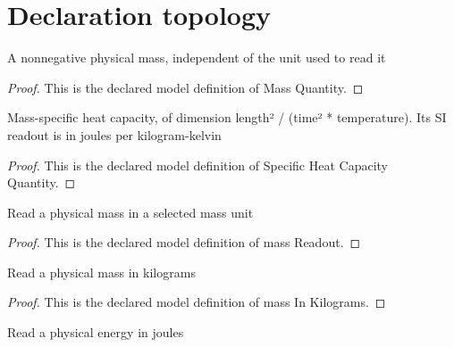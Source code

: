 \section{Declaration topology}
\begin{definition}
  \label{def:physics:phyx-mini-0456:phyxminiproblems-problemphyxmini0456-massquantity}
  A nonnegative physical mass, independent of the unit used to read it
\end{definition}
\begin{proof}
  This is the declared model definition of Mass Quantity.
\end{proof}
\begin{definition}
  \label{def:physics:phyx-mini-0456:phyxminiproblems-problemphyxmini0456-specificheatcapacityquantity}
  Mass-specific heat capacity, of dimension length² / (time² * temperature). Its SI readout is in joules per kilogram-kelvin
\end{definition}
\begin{proof}
  This is the declared model definition of Specific Heat Capacity Quantity.
\end{proof}
\begin{definition}
  \label{def:physics:phyx-mini-0456:phyxminiproblems-problemphyxmini0456-massreadout}
  Read a physical mass in a selected mass unit
\end{definition}
\begin{proof}
  This is the declared model definition of mass Readout.
\end{proof}
\begin{definition}
  \label{def:physics:phyx-mini-0456:phyxminiproblems-problemphyxmini0456-massinkilograms}
  Read a physical mass in kilograms
\end{definition}
\begin{proof}
  This is the declared model definition of mass In Kilograms.
\end{proof}
\begin{definition}
  \label{def:physics:phyx-mini-0456:phyxminiproblems-problemphyxmini0456-energyinjoules}
  Read a physical energy in joules
\end{definition}
